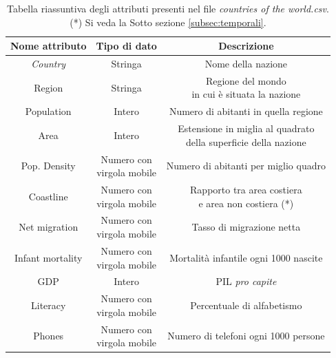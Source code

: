 \begin{table}
	\caption{Tabella riassuntiva degli attributi presenti nel file \textit{countries of the world.csv}.\\(*) Si veda la Sotto sezione \ref{subsec:temporali}.}

	\label{tab:world_countires_att}

	\centering
	\begin{tabular}{|c|c|c|}
		\hline
		\textbf{Nome attributo} & \textbf{Tipo di dato} & \textbf{Descrizione} \\ 
		\hline  
		\rule{0pt}{13pt}\emph{Country} & Stringa & Nome della nazione \\ 
		\hline  
		\rule{0pt}{24pt}Region & Stringa & \shortstack{Regione del mondo \\ in cui è situata la nazione} \\ 
		\hline  
		\rule{0pt}{13pt}Population & Intero & Numero di abitanti in quella regione \\ 
		\hline  
		\rule{0pt}{24pt}Area & Intero & \shortstack{Estensione in miglia al quadrato \\ della superficie della nazione} \\ 
		\hline   
		\rule{0pt}{24pt}Pop. Density & \shortstack{Numero con \\ virgola mobile} & Numero di abitanti per miglio quadro \\ 
		\hline   
		\rule{0pt}{24pt}Coastline & \shortstack{Numero con \\ virgola mobile} & \shortstack{Rapporto tra area costiera \\ e area non costiera (*)} \\ 
		\hline   
		\rule{0pt}{24pt}Net migration & \shortstack{Numero con \\ virgola mobile} & Tasso di migrazione netta \\ 
		\hline  
		\rule{0pt}{24pt}Infant mortality & \shortstack{Numero con \\ virgola mobile} & Mortalità infantile ogni 1000 nascite \\ 
		\hline  
		\rule{0pt}{13pt}GDP & Intero & PIL \textit{pro capite} \\ 
		\hline  
		\rule{0pt}{24pt}Literacy & \shortstack{Numero con \\ virgola mobile} & Percentuale di alfabetismo \\ 
		\hline  
		\rule{0pt}{24pt}Phones & \shortstack{Numero con \\ virgola mobile} & Numero di telefoni ogni 1000 persone \\ 

\end{tabular}
\end{table}
